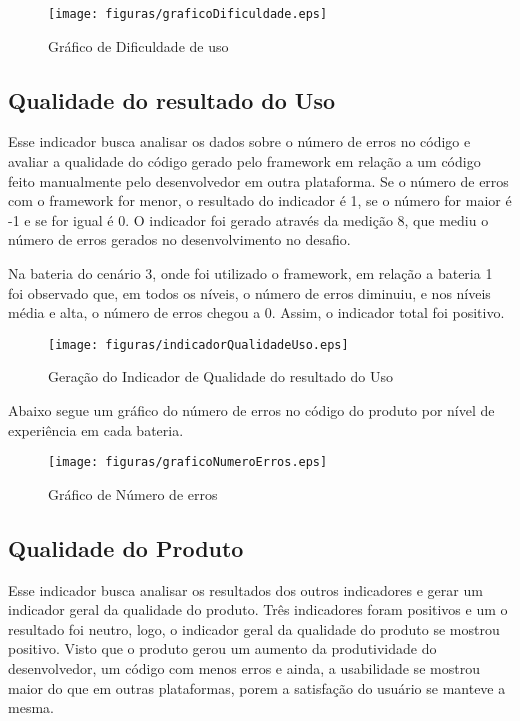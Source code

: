 \begin{figure}[H]
  \centering
  \label{fig:graficoIndicador3}
  \texttt{[image: figuras/graficoDificuldade.eps]}
  \caption{Gráfico de Dificuldade de uso}
\end{figure}

\subsection{Qualidade do resultado do Uso}

Esse indicador busca analisar os dados sobre o número de erros no código e avaliar a qualidade do código gerado pelo
framework em relação a um código feito manualmente pelo desenvolvedor em outra plataforma. Se o número de erros com o
framework for menor, o resultado do indicador é 1, se o número for maior é -1 e se for igual é 0. O indicador foi gerado
através da medição 8, que mediu o número de erros gerados no desenvolvimento no desafio.

Na bateria do cenário 3, onde foi utilizado o framework, em relação a bateria 1 foi observado que, em todos os níveis,
o número de erros diminuiu, e nos níveis média e alta, o número de erros chegou a 0. Assim, o indicador total foi
positivo.

\begin{figure}[H]
  \centering
  \label{fig:indicador4}
  \texttt{[image: figuras/indicadorQualidadeUso.eps]}
  \caption{Geração do Indicador de Qualidade do resultado do Uso}
\end{figure}

Abaixo segue um gráfico do número de erros no código do produto por nível de experiência em cada bateria.

\begin{figure}[H]
  \centering
  \label{fig:graficoIndicador4}
  \texttt{[image: figuras/graficoNumeroErros.eps]}
  \caption{Gráfico de Número de erros}
\end{figure}

\subsection{Qualidade do Produto}

Esse indicador busca analisar os resultados dos outros indicadores e gerar um indicador geral da qualidade do produto.
Três indicadores foram positivos e um o resultado foi neutro, logo, o indicador geral da qualidade do produto se mostrou
positivo. Visto que o produto gerou um aumento da produtividade do desenvolvedor, um código com menos erros e ainda, a
usabilidade se mostrou maior do que em outras plataformas, porem a satisfação do usuário se manteve a mesma.

